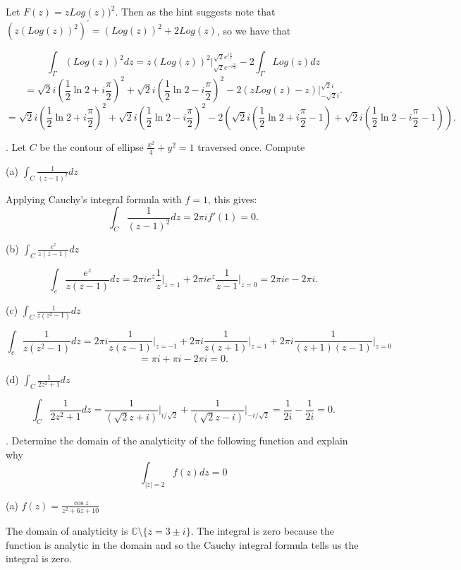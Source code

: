 \documentclass[letterpaper, reqno,11pt]{article}
\begin{document}
Let $F(z)=zLog(z))^2$. Then as the hint suggests note that $( z (Log (z))^2)^{'} = (Log (z))^2 + 2 Log (z)$, so we have that

\[
    \int_{\Gamma} (Log(z))^2dz=z(Log(z))^2\bigg|_{\sqrt{2}e^{-i\frac{\pi}{2}} }^{\sqrt{2}e^{i\frac{\pi}{2}} }-2\int_\Gamma Log(z)dz
\]
\[
=\sqrt{2}i\left( \frac{1}{2}\ln 2+i\frac{\pi}{2} \right)^2 +\sqrt{2}i\left( \frac{1}{2}\ln 2-i\frac{\pi}{2} \right)^2-2\left( zLog(z)-z \right)\bigg|_{-\sqrt{2} i}^{\sqrt{2} i}
.\]
\[
=\sqrt{2}i\left( \frac{1}{2}\ln 2+i\frac{\pi}{2} \right)^2 +\sqrt{2}i\left( \frac{1}{2}\ln 2-i\frac{\pi}{2} \right)^2-2\left( \sqrt{2} i\left( \frac{1}{2}\ln 2+i \frac{\pi}{2}-1 \right) +\sqrt{2} i\left( \frac{1}{2}\ln 2-i \frac{\pi}{2}-1 \right) \right) 
.\]




\medskip

. Let $C$ be the contour of ellipse $ \frac{x^2}{4}+ y^2=1$ traversed once. Compute

(a) $ \int_C \frac{ 1 }{ (z-1)^2 } dz$

Applying Cauchy's integral formula with $f=1$, this gives: 
\[
\int_C \frac{1}{(z-1)^2}dz=2\pi if'(1)=0
.\]

(b) $ \int_C \frac{ e^z }{ z (z-1) } dz$

\[
\int_c \frac{e^{z}}{z(z-1)}dz=2\pi i e^{z} \frac{1}{z}\bigg|_{z=1} +2\pi i e^{z}\frac{1}{z-1}\bigg|_{z=0}=2\pi ie-2\pi i
.\]

(c) $ \int_C \frac{ 1 }{ z (z^2-1) } dz$

\[
\int_c \frac{1}{z(z^2-1)}dz=2\pi i  \frac{1}{z(z-1)}\bigg|_{z=-1}+2\pi i  \frac{1}{z(z+1)}\bigg|_{z=1} +2\pi i \frac{1}{(z+1)(z-1)}\bigg|_{z=0} 
\]
\[
=\pi i+\pi i -2\pi i=0
.\]

(d) $ \int_{C} \frac{1}{ 2z^2+1} dz $

\[
\int_{C} \frac{1}{ 2z^2+1} dz=\frac{1}{\left(\sqrt{2} z+i  \right) }\bigg|_{i/\sqrt{2} }+\frac{1}{\left(\sqrt{2} z-i  \right) }\bigg|_{-i /\sqrt{2} }=\frac{1}{2i}-\frac{1}{2i}=0
.\]


\medskip

. Determine the domain of the analyticity of the following function and explain why
$$ \int_{|z|=2} f(z) dz=0 $$

(a) $f(z)=\frac{\cos z}{ z^2+6z+10}$

The domain of analyticity is $\mathbb{C}\setminus \{ z=3\pm i \} $. The integral is zero because the function is analytic in the domain and so the Cauchy integral formula tells us the integral is zero. 
\end{document}
